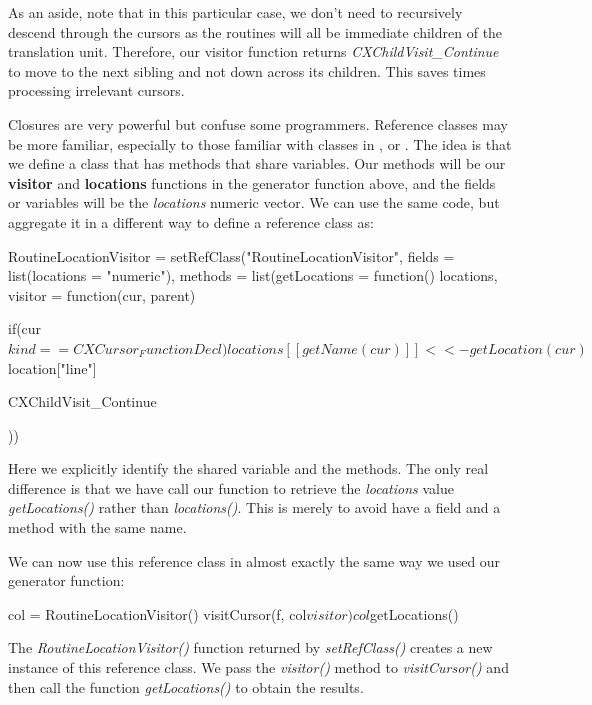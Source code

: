 \documentclass[article]{jss}
\def\Cpp{\proglang{C$++$}}
\def\Java{\proglang{Java}}
\def\Python{\proglang{Python}}
\def\R{\proglang{R}}
\def\Rfunc#1{\textsl{#1()}}
\def\Rvar#1{\textsl{#1}}
\def\Rel#1{\textbf{#1}}
\begin{document}
As an aside, note that in this particular case, we don't need to
recursively descend through the cursors as the routines will all be
immediate children of the translation unit.  Therefore, our visitor
function returns \Rvar{CXChildVisit_Continue} to move to the next
sibling and not down across its children.  This saves times processing
irrelevant cursors.

Closures are very powerful but confuse some \R{} programmers.
Reference classes may be more familiar, especially to those familiar
with classes in \Cpp, \Java{} or \Python.  The idea is that we define
a class that has methods that share variables.  Our methods will be
our \Rel{visitor} and \Rel{locations} functions in the generator
function above, and the fields or variables will be the
\Rvar{locations} numeric vector.  We can use the same code, but
aggregate it in a different way to define a reference class as:
\begin{RCode}
RoutineLocationVisitor =
setRefClass("RoutineLocationVisitor",
    fields = list(locations = "numeric"),
    methods = list(getLocations = function() 
                                     locations,
                   visitor = 
                       function(cur, parent) {
                         if(cur$kind == CXCursor_FunctionDecl) 
                            locations[[ getName(cur) ]] <<- 
                                   getLocation(cur)$location["line"]
                               
                         CXChildVisit_Continue
                       }))
\end{RCode}
Here we explicitly identify the shared variable and the methods.  The
only real difference is that we have call our function to retrieve the
\Rvar{locations} value \Rfunc{getLocations} rather than
\Rfunc{locations}.  This is merely to avoid have a field and a method
with the same name.

We can now use this reference class in almost exactly the same way we
used our  generator function:
\begin{RCode}
col = RoutineLocationVisitor()
visitCursor(f, col$visitor)
col$getLocations()
\end{RCode}
The \Rfunc{RoutineLocationVisitor} function returned by
\Rfunc{setRefClass} creates a new instance of this reference class.
We pass the \Rfunc{visitor} method to \Rfunc{visitCursor} and then
call the function \Rfunc{getLocations} to obtain the results.
\end{document}
